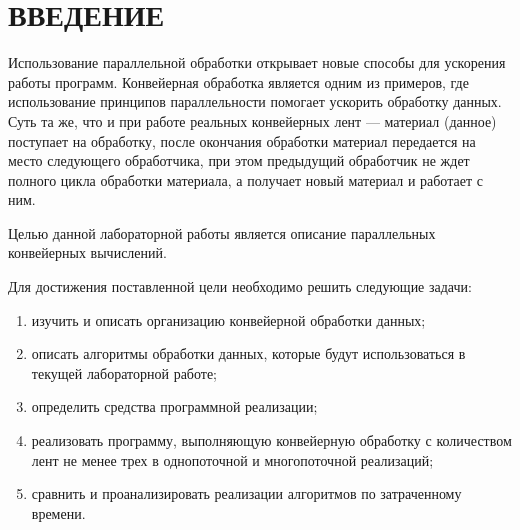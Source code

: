 \chapter*{ВВЕДЕНИЕ}

Использование параллельной обработки открывает новые способы
для ускорения работы программ. 
Конвейерная обработка является одним
из примеров, где использование принципов параллельности помогает ускорить обработку данных. 
Суть та же, что и при работе реальных конвейерных лент --- материал (данное) поступает на обработку, после окончания обработки материал передается на место следующего обработчика, при этом
предыдущий обработчик не ждет полного цикла обработки материала, а
получает новый материал и работает с ним.

Целью данной лабораторной работы является описание параллельных конвейерных вычислений.

Для достижения поставленной цели необходимо решить следующие задачи:

\begin{enumerate}[label={\arabic*)}]
	\item изучить и описать организацию конвейерной обработки данных;
	\item описать алгоритмы обработки данных, которые будут использоваться в
	текущей лабораторной работе;
	\item определить средства программной реализации;
	\item реализовать программу, выполняющую конвейерную обработку с количеством лент не менее трех в однопоточной и многопоточной реализаций;
	\item сравнить и проанализировать реализации алгоритмов по затраченному времени.
\end{enumerate}
